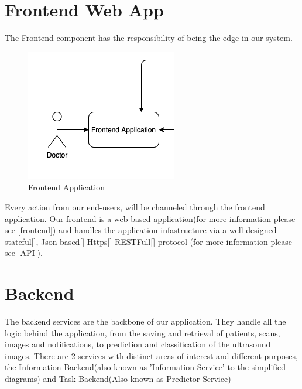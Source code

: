	\section{Frontend Web App}
		The Frontend component has the responsibility of being the edge in our system.
		\begin{figure}[H]
			\iftrue
			\caption{Frontend Application}
			\centering
			\includegraphics[scale=0.3]{figures/frontend}
			\fi
		\end{figure}
		Every action from our end-users, will be channeled through the frontend application. Our frontend is a web-based application(for 
		more information please see \ref{frontend}) and handles the application infastructure via a well designed stateful[\cite{session-rfc6265}],
		Json-based[\cite{json-rfc7159}] Https[\cite{rfc2818}] RESTFull[\cite{restful-rfc7231}]
		protocol (for more information please see \ref{API}).
	\section{Backend}
		The backend services are the backbone of our application. They handle all the logic behind the application, from the saving and 
		retrieval of patients, scans, images and notifications, to prediction and classification of the ultrasound images. There are 2 
		services with distinct areas of interest and different purposes, the Information Backend(also known as 'Information Service' to the 
		simplified diagrams) and Task Backend(Also known as Predictor Service)

